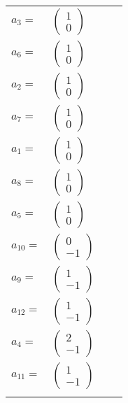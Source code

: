 \documentclass[1p]{elsarticle_modified}
\theoremstyle{definition}
\begin{document}
\begin{tabular}{m{7pt} m{180pt} m{7pt} m{180pt} }
\flushright $a_{3}=$&$\begin{pmatrix}1\\0\end{pmatrix}$ \\
\flushright $a_{6}=$&$\begin{pmatrix}1\\0\end{pmatrix}$ \\
\flushright $a_{2}=$&$\begin{pmatrix}1\\0\end{pmatrix}$ \\
\flushright $a_{7}=$&$\begin{pmatrix}1\\0\end{pmatrix}$ \\
\flushright $a_{1}=$&$\begin{pmatrix}1\\0\end{pmatrix}$ \\
\flushright $a_{8}=$&$\begin{pmatrix}1\\0\end{pmatrix}$ \\
\flushright $a_{5}=$&$\begin{pmatrix}1\\0\end{pmatrix}$ \\
\flushright $a_{10}=$&$\begin{pmatrix}0\\-1\end{pmatrix}$ \\
\flushright $a_{9}=$&$\begin{pmatrix}1\\-1\end{pmatrix}$ \\
\flushright $a_{12}=$&$\begin{pmatrix}1\\-1\end{pmatrix}$ \\
\flushright $a_{4}=$&$\begin{pmatrix}2\\-1\end{pmatrix}$ \\
\flushright $a_{11}=$&$\begin{pmatrix}1\\-1\end{pmatrix}$\\&\end{tabular}
\end{document}
